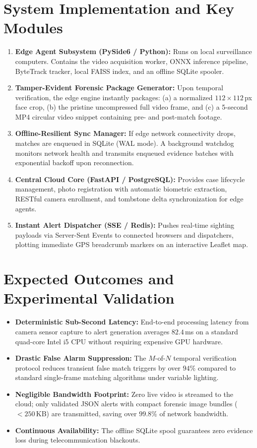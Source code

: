 \documentclass[10pt, a4paper]{article}
\begin{document}
\section{System Implementation and Key Modules}
\begin{enumerate}
    \item \textbf{Edge Agent Subsystem (PySide6 / Python):} Runs on local surveillance computers. Contains the video acquisition worker, ONNX inference pipeline, ByteTrack tracker, local FAISS index, and an offline SQLite spooler.
    \item \textbf{Tamper-Evident Forensic Package Generator:} Upon temporal verification, the edge engine instantly packages: (a) a normalized $112\times112$\,px face crop, (b) the pristine uncompressed full video frame, and (c) a 5-second MP4 circular video snippet containing pre- and post-match footage.
    \item \textbf{Offline-Resilient Sync Manager:} If edge network connectivity drops, matches are enqueued in SQLite (WAL mode). A background watchdog monitors network health and transmits enqueued evidence batches with exponential backoff upon reconnection.
    \item \textbf{Central Cloud Core (FastAPI / PostgreSQL):} Provides case lifecycle management, photo registration with automatic biometric extraction, RESTful camera enrollment, and tombstone delta synchronization for edge agents.
    \item \textbf{Instant Alert Dispatcher (SSE / Redis):} Pushes real-time sighting payloads via Server-Sent Events to connected browsers and dispatchers, plotting immediate GPS breadcrumb markers on an interactive Leaflet map.
\end{enumerate}

\section{Expected Outcomes and Experimental Validation}
\begin{itemize}
    \item \textbf{Deterministic Sub-Second Latency:} End-to-end processing latency from camera sensor capture to alert generation averages $82.4$\,ms on a standard quad-core Intel i5 CPU without requiring expensive GPU hardware.
    \item \textbf{Drastic False Alarm Suppression:} The $M$-of-$N$ temporal verification protocol reduces transient false match triggers by over $94\%$ compared to standard single-frame matching algorithms under variable lighting.
    \item \textbf{Negligible Bandwidth Footprint:} Zero live video is streamed to the cloud; only validated JSON alerts with compact forensic image bundles ($<250$\,KB) are transmitted, saving over $99.8\%$ of network bandwidth.
    \item \textbf{Continuous Availability:} The offline SQLite spool guarantees zero evidence loss during telecommunication blackouts.
\end{itemize}
\end{document}
